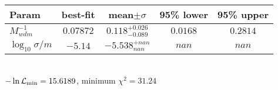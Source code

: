 \begin{tabular}{|l|c|c|c|c|} 
 \hline 
Param & best-fit & mean$\pm\sigma$ & 95\% lower & 95\% upper \\ \hline 
$M_{wdm}^{-1}$ &$0.07872$ & $0.118_{-0.089}^{+0.026}$ & $0.0168$ & $0.2814$ \\ 
$\log_{10}{\sigma / m}$ &$-5.14$ & $-5.538_{nan}^{+nan}$ & $nan$ & $nan$ \\ 
\hline 
 \end{tabular} \\ 
$-\ln{\cal L}_\mathrm{min} =15.6189$, minimum $\chi^2=31.24$ \\ 
